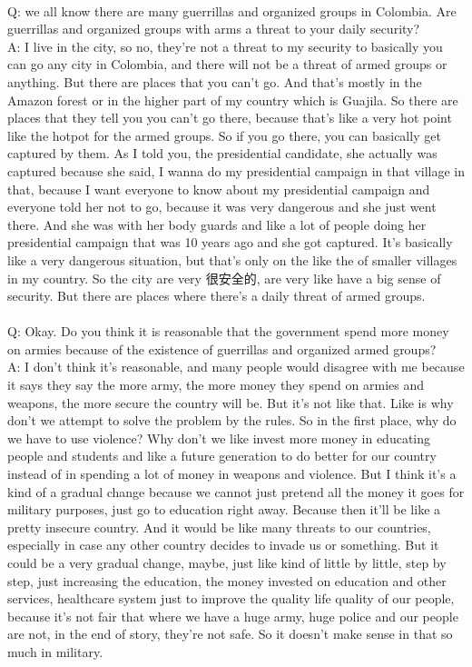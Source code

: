 \documentclass{phyasgn}\usepackage{nag}
\begin{document}
\\
Q: we all know there are many guerrillas and organized groups in Colombia. Are guerrillas and organized groups with arms a threat to your daily security?\\
A: I live in the city, so no, they're not a threat to my security to basically you can go any city in Colombia, and there will not be a threat of armed groups or anything. But there are places that you can't go. And that's mostly in the Amazon forest or in the higher part of my country which is Guajila. So there are places that they tell you you can't go there, because that's like a very hot point like the hotpot for the armed groups. So if you go there, you can basically get captured by them. As I told you, the presidential candidate, she actually was captured because she said, I wanna do my presidential campaign in that village in that, because I want everyone to know about my presidential campaign and everyone told her not to go, because it was very dangerous and she just went there. And she was with her body guards and like a lot of people doing her presidential campaign that was 10 years ago and she got captured. It's basically like a very dangerous situation, but that's only on the like the of smaller villages in my country. So the city are very 很安全的, are very like have a big sense of security. But there are places where there's a daily threat of armed groups.\\
\\
Q: Okay. Do you think it is reasonable that the government spend more money on armies because of the existence of guerrillas and organized armed groups?\\
A: I don't think it's reasonable, and many people would disagree with me because it says they say the more army, the more money they spend on armies and weapons, the more secure the country will be. But it's not like that. Like is why don't we attempt to solve the problem by the rules. So in the first place, why do we have to use violence? Why don't we like invest more money in educating people and students and like a future generation to do better for our country instead of in spending a lot of money in weapons and violence. But I think it's a kind of a gradual change because we cannot just pretend all the money it goes for military purposes, just go to education right away. Because then it'll be like a pretty insecure country. And it would be like many threats to our countries, especially in case any other country decides to invade us or something. But it could be a very gradual change, maybe, just like kind of little by little, step by step, just increasing the education, the money invested on education and other services, healthcare system just to improve the quality life quality of our people, because it's not fair that where we have a huge army, huge police and our people are not, in the end of story, they're not safe. So it doesn't make sense in that so much in military.\\
\end{document}

